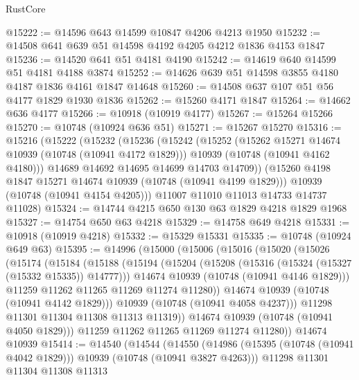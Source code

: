 \begin{lexlean}{RustCore}
\begin{coremodule}
@15222 := @14596 @643 @14599 @10847 @4206 @4213 @1950
@15232 := @14508 @641 @639 @51 @14598 @4192 @4205 @4212 @1836 @4153 @1847
@15236 := @14520 @641 @51 @4181 @4190
@15242 := @14619 @640 @14599 @51 @4181 @4188 @3874
@15252 := @14626 @639 @51 @14598 @3855 @4180 @4187 @1836 @4161 @1847 @14648
@15260 := @14508 @637 @107 @51 @56 @4177 @1829 @1930 @1836
@15262 := @15260 @4171 @1847
@15264 := @14662 @636 @4177
@15266 := @10918 (@10919 @4177)
@15267 := @15264 @15266
@15270 := @10748 (@10924 @636 @51)
@15271 := @15267 @15270
@15316 := @15216
    (@15222
      (@15232
        (@15236
          (@15242
            (@15252
              (@15262 @15271 @14674 @10939 (@10748 (@10941 @4172 @1829)))
              @10939
              (@10748 (@10941 @4162 @4180)))
            @14689
            @14692
            @14695
            @14699
            @14703
            @14709))
        (@15260 @4198 @1847 @15271 @14674 @10939 (@10748 (@10941 @4199 @1829)))
        @10939
        (@10748 (@10941 @4154 @4205)))
      @11007
      @11010
      @11013
      @14733
      @14737
      @11028)
@15324 := @14744 @4215 @650 @130 @63 @1829 @4218 @1829 @1968
@15327 := @14754 @650 @63 @4218
@15329 := @14758 @649 @4218
@15331 := @10918 (@10919 @4218)
@15332 := @15329 @15331
@15335 := @10748 (@10924 @649 @63)
@15395 := @14996
    (@15000
      (@15006
        (@15016
          (@15020
            (@15026
              (@15174
                (@15184
                  (@15188
                    (@15194
                      (@15204
                        (@15208 (@15316 (@15324 (@15327 (@15332 @15335)) @14777)))
                        @14674
                        @10939
                        (@10748 (@10941 @4146 @1829)))
                      @11259
                      @11262
                      @11265
                      @11269
                      @11274
                      @11280))
                  @14674
                  @10939
                  (@10748 (@10941 @4142 @1829)))
                @10939
                (@10748 (@10941 @4058 @4237)))
              @11298
              @11301
              @11304
              @11308
              @11313
              @11319))
          @14674
          @10939
          (@10748 (@10941 @4050 @1829)))
        @11259
        @11262
        @11265
        @11269
        @11274
        @11280))
    @14674
    @10939
@15414 := @14540
    (@14544
      (@14550
        (@14986 (@15395 (@10748 (@10941 @4042 @1829))) @10939 (@10748 (@10941 @3827 @4263)))
        @11298
        @11301
        @11304
        @11308
        @11313

\end{coremodule}
\end{lexlean}
